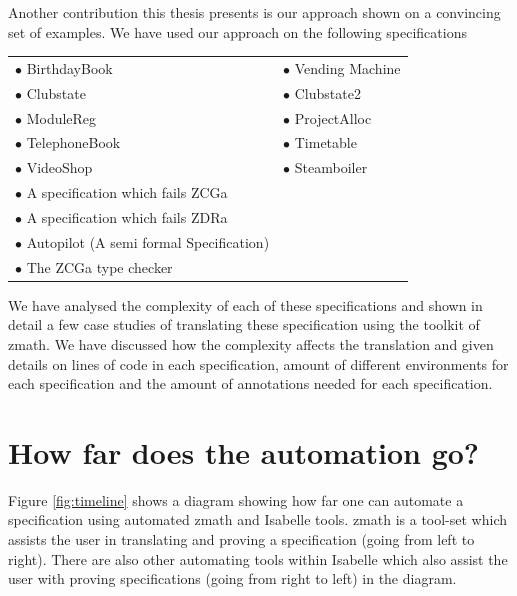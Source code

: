 Another contribution this thesis presents is our approach shown on a convincing
set of examples. We have used our approach on the following specifications

\begin{tabular}{l l}
$\bullet$ BirthdayBook \cite{spiveyreferencemanual} & $\bullet$ Vending Machine
\cite{pp} \\
$\bullet$ Clubstate \cite{essenceofz} & $\bullet$ Clubstate2 \cite{essenceofz}
\\
$\bullet$ ModuleReg \cite{essenceofz} & $\bullet$ ProjectAlloc \cite{essenceofz}
\\
$\bullet$ TelephoneBook & $\bullet$ Timetable \cite{essenceofz} \\
$\bullet$ VideoShop \cite{essenceofz} & $\bullet$ Steamboiler
\cite{steamboilerslides} \\
$\bullet$ A specification which fails ZCGa & \\
$\bullet$ A specification which fails ZDRa & \\
$\bullet$ Autopilot (A semi formal Specification) \cite{Butler96} & \\
$\bullet$ The ZCGa type checker & \\
\end{tabular}

We have analysed the complexity of each of these specifications and shown in
detail a few case studies of translating these specification using the toolkit
of \gls{zmath}. We have discussed how the complexity affects the translation and
given details on lines of code in each specification, amount of different
environments for each specification and the amount of annotations needed for
each specification.

\section{How far does the automation go?}

Figure \ref{fig:timeline} shows a diagram showing how far one can automate a
specification using automated \gls{zmath} and Isabelle tools. \Gls{zmath} is a
tool-set which assists the user in translating and proving a specification (going
from left to right). There are also other automating tools within Isabelle which
also assist the user with proving specifications (going from right to left) in
the diagram.

